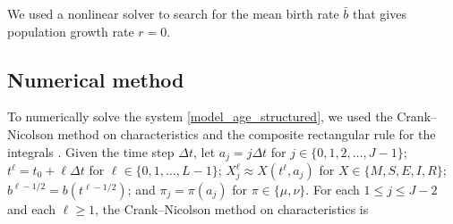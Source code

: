 \documentclass{jpmarticle}
\begin{document}
We used a nonlinear solver to search for the mean birth rate $\bar{b}$
that gives population growth rate $r = 0$.


\subsection{Numerical method}

To numerically solve the system \eqref{model_age_structured}, we used
the Crank--Nicolson method on characteristics and the composite
rectangular rule for the integrals \autocite{milner_1992}.  Given the
time step $\Delta t$, let
$a_j = j \Delta t$ for $j \in \{0, 1, 2, \ldots, J - 1\}$;
$t^{\ell} = t_0 + \ell \Delta t$ for $\ell \in \{0, 1, \ldots, L - 1\}$;
$X_j^{\ell} \approx X(t^{\ell}, a_j)$ for $X \in \{M, S, E, I, R\}$;
$b^{\ell - 1 / 2} = b(t^{\ell - 1 / 2})$; and
$\pi_j = \pi(a_j)$ for $\pi \in \{\mu, \nu\}$.
For each $1 \leq j \leq J - 2$ and each $\ell \geq 1$, the
Crank--Nicolson method on characteristics is
\end{document}
